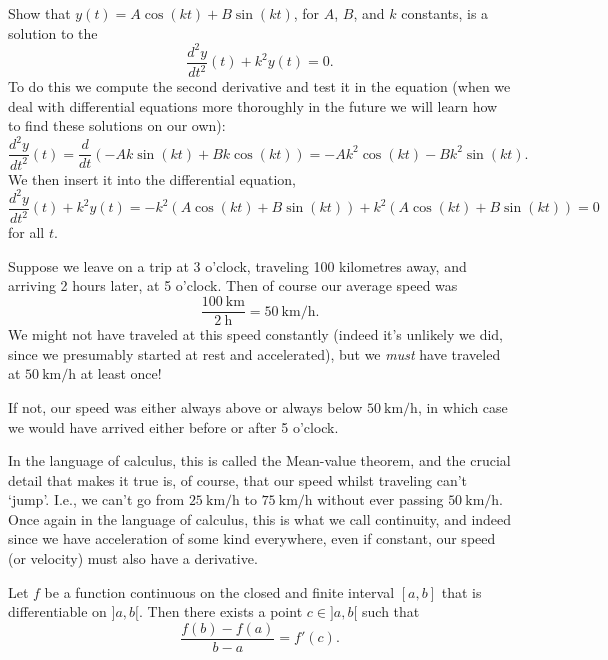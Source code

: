 \begin{example}
	Show that $y(t) = A \cos(k t) + B \sin(k t)$, for $A$, $B$, and $k$ constants, is a solution to the 
	\[
		\frac{d^2 y}{d t^2} (t) + k^2 y(t) = 0.
	\]
	To do this we compute the second derivative and test it in the equation (when we deal with differential equations more thoroughly in the future we will learn how to find these solutions on our own):
	\[
		\frac{d^2 y}{d t^2}(t) = \frac{d}{d t} (-A k \sin(k t) + B k \cos(k t)) = -A k^2 \cos(k t) - B k^2 \sin(k t).
	\]
	We then insert it into the differential equation,
	\[
		\frac{d^2 y}{d t^2} (t) + k^2 y(t) = - k^2 (A \cos(k t) + B \sin(k t)) + k^2 (A \cos(k t) + B \sin(k t)) = 0
	\]
	for all $t$.
\end{example}


\begin{example}
	Suppose we leave on a trip at 3 o'clock, traveling 100 kilometres away, and arriving 2 hours later, at 5 o'clock.
	Then of course our average speed was
	\[
		\frac{\SI{100}{\kilo\metre}}{\SI{2}{\hour}} = \SI[per-mode = symbol]{50}{\kilo\metre\per\hour}.
	\]
	We might not have traveled at this speed constantly (indeed it's unlikely we did, since we presumably started at rest and accelerated), but we \emph{must} have traveled at $\SI[per-mode = symbol]{50}{\kilo\metre\per\hour}$ at least once!

	If not, our speed was either always above or always below $\SI[per-mode = symbol]{50}{\kilo\metre\per\hour}$, in which case we would have arrived either before or after 5 o'clock.
\end{example}

\noindent
In the language of calculus, this is called the Mean-value theorem, and the crucial detail that makes it true is, of course, that our speed whilst traveling can't `jump'.
I.e., we can't go from $\SI[per-mode = symbol]{25}{\kilo\metre\per\hour}$ to $\SI[per-mode = symbol]{75}{\kilo\metre\per\hour}$ without ever passing $\SI[per-mode = symbol]{50}{\kilo\metre\per\hour}$.
Once again in the language of calculus, this is what we call continuity, and indeed since we have acceleration of some kind everywhere, even if constant, our speed (or velocity) must also have a derivative.

\begin{theorem}
	Let $f$ be a function continuous on the closed and finite interval $[a, b]$ that is differentiable on $]{a, b}[$.
	Then there exists a point $c \in {]{a, b}[}$ such that
	\[
		\frac{f(b) - f(a)}{b - a} = f'(c).
	\]
\end{theorem}

